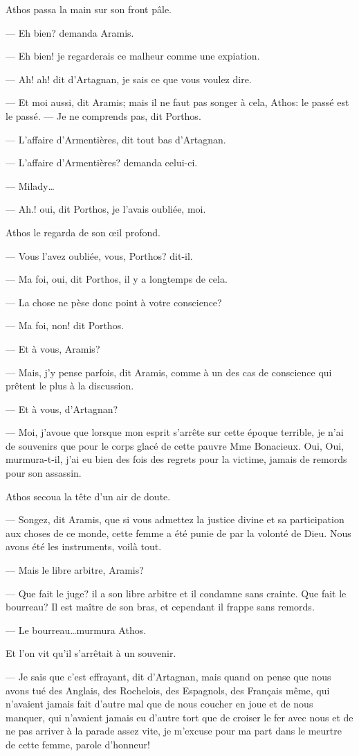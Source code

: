 Athos passa la main sur son front pâle.

— Eh bien? demanda Aramis.

— Eh bien! je regarderais ce malheur comme une expiation.

— Ah! ah! dit d'Artagnan, je sais ce que vous voulez dire.

— Et moi aussi, dit Aramis; mais il ne faut pas songer à cela, Athos: le passé est le passé.
— Je ne comprends pas, dit Porthos.

— L'affaire d'Armentières, dit tout bas d'Artagnan.

— L'affaire d'Armentières? demanda celui-ci.

— Milady\dots

— Ah.! oui, dit Porthos, je l'avais oubliée, moi.

Athos le regarda de son œil profond.

— Vous l'avez oubliée, vous, Porthos? dit-il.

— Ma foi, oui, dit Porthos, il y a longtemps de cela.

— La chose ne pèse donc point à votre conscience?

— Ma foi, non! dit Porthos.

— Et à vous, Aramis?

— Mais, j'y pense parfois, dit Aramis, comme à un des cas de conscience qui prêtent le plus à la discussion.

— Et à vous, d'Artagnan?

— Moi, j'avoue que lorsque mon esprit s'arrête sur cette époque terrible, je n'ai de souvenirs que pour le corps glacé de cette pauvre Mme Bonacieux. Oui, Oui, murmura-t-il, j'ai eu bien des fois des regrets pour la victime, jamais de remords pour son assassin.

Athos secoua la tête d'un air de doute.

— Songez, dit Aramis, que si vous admettez la justice divine et sa participation aux choses de ce monde, cette femme a été punie de par la volonté de Dieu. Nous avons été les instruments, voilà tout.

— Mais le libre arbitre, Aramis?

— Que fait le juge? il a son libre arbitre et il condamne sans crainte. Que fait le bourreau? Il est maître de son bras, et cependant il frappe sans remords.

— Le bourreau\dots murmura Athos.

Et l'on vit qu'il s'arrêtait à un souvenir.

— Je sais que c'est effrayant, dit d'Artagnan, mais quand on pense que nous avons tué des Anglais, des Rochelois, des Espagnols, des Français même, qui n'avaient jamais fait d'autre mal que de nous coucher en joue et de nous manquer, qui n'avaient jamais eu d'autre tort que de croiser le fer avec nous et de ne pas arriver à la parade assez vite, je m'excuse pour ma part dans le meurtre de cette femme, parole d'honneur!

